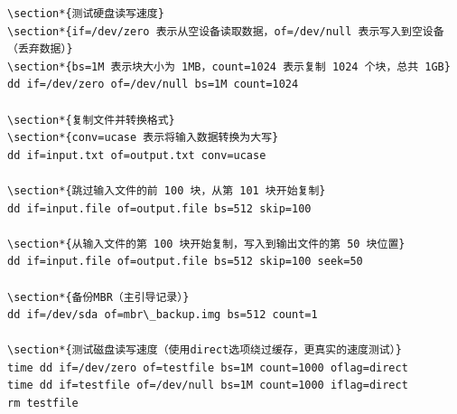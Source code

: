 \documentclass[12pt,UTF8]{ctexbook}
\begin{document}
\begin{verbatim}
\section*{测试硬盘读写速度}
\section*{if=/dev/zero 表示从空设备读取数据，of=/dev/null 表示写入到空设备（丢弃数据）}
\section*{bs=1M 表示块大小为 1MB，count=1024 表示复制 1024 个块，总共 1GB}
dd if=/dev/zero of=/dev/null bs=1M count=1024

\section*{复制文件并转换格式}
\section*{conv=ucase 表示将输入数据转换为大写}
dd if=input.txt of=output.txt conv=ucase

\section*{跳过输入文件的前 100 块，从第 101 块开始复制}
dd if=input.file of=output.file bs=512 skip=100

\section*{从输入文件的第 100 块开始复制，写入到输出文件的第 50 块位置}
dd if=input.file of=output.file bs=512 skip=100 seek=50

\section*{备份MBR（主引导记录）}
dd if=/dev/sda of=mbr\_backup.img bs=512 count=1

\section*{测试磁盘读写速度（使用direct选项绕过缓存，更真实的速度测试）}
time dd if=/dev/zero of=testfile bs=1M count=1000 oflag=direct
time dd if=testfile of=/dev/null bs=1M count=1000 iflag=direct
rm testfile
\end{verbatim}
\end{document}
